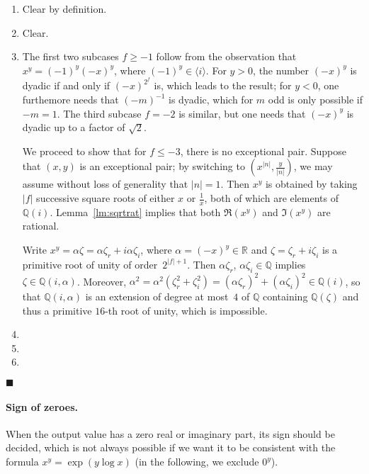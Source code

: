 \documentclass [11pt]{article}
\newcommand {\Q}{\mathbb Q}
\newcommand {\R}{\mathbb R}
\renewcommand {\leq}{\leqslant}
\renewcommand {\geq}{\geqslant}
\newenvironment{proof}{\noindent{\bf Proof:}}{{\hspace* {\fill}$\blacksquare$}}
\begin{document}
\begin {proof}
\begin {enumerate}
\item
Clear by definition.
\item
Clear.
\item
The first two subcases $f \geq -1$ follow from the observation that
$x^y = (-1)^y (-x)^y$, where $(-1)^y \in \langle i \rangle$.
For $y > 0$, the number $(-x)^y$ is dyadic if and only if $(-x)^{2^f}$ is,
which leads to the result; for $y < 0$, one furthemore needs that
$(-m)^{-1}$ is dyadic, which for $m$ odd is only possible if $-m = 1$.
The third subcase $f = -2$ is similar, but one needs that $(-x)^y$ is dyadic
up to a factor of $\sqrt 2$.

We proceed to show that for $f \leq -3$, there is no exceptional pair.
Suppose that $(x, y)$ is an exceptional pair; by switching to
$\left( x^{|n|}, \frac {y}{|n|} \right)$, we may assume
without loss of generality that $|n| = 1$. Then $x^y$ is obtained by
taking $|f|$ successive square roots of either $x$ or $\frac {1}{x}$, both
of which are elements of $\Q (i)$. Lemma~\ref {lm:sqrtrat} implies
that both $\Re (x^y)$ and $\Im (x^y)$ are rational.

Write $x^y = \alpha \zeta = \alpha \zeta_r + i \alpha \zeta_i$, where
$\alpha = (-x)^y \in \R$ and $\zeta = \zeta_r + i \zeta_i$ is a primitive root
of unity of order~$2^{|f| + 1}$.
Then $\alpha \zeta_r$, $\alpha \zeta_i \in \Q$ implies $\zeta \in \Q (i, \alpha)$.
Moreover,
$\alpha^2 = \alpha^2 (\zeta_r^2 + \zeta_i^2) =
(\alpha \zeta_r)^2 + (\alpha \zeta_i)^2 \in \Q (i)$, so that $\Q (i, \alpha)$
is an extension of degree at most~$4$ of $\Q$ containing $\Q (\zeta)$
and thus a primitive $16$-th root of unity, which is impossible.
\item
\item
\item
\end {enumerate}
\end {proof}

\paragraph{Sign of zeroes.}
When the output value has a zero real or imaginary part, its sign should be
decided, which is not always possible if we want it to be consistent with the
formula $x^y = \exp(y\log x)$ (in the following, we exclude $0^y$).
\end{document}
